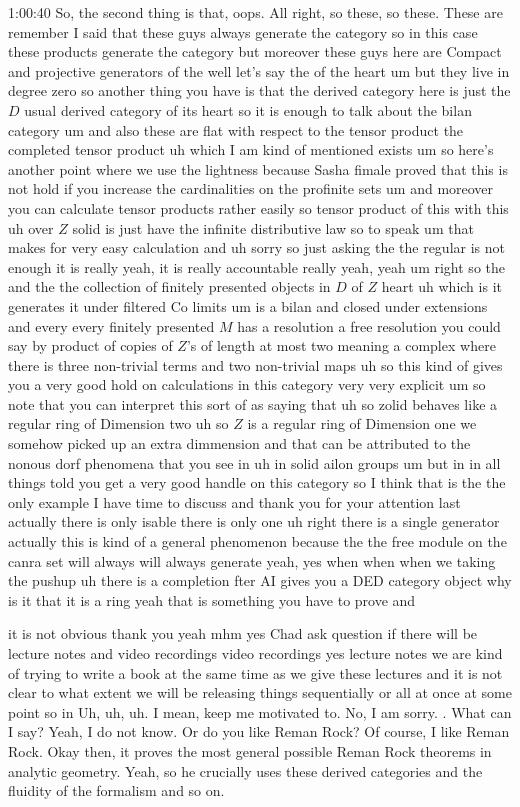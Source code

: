 \begin{unfinished}{1:00:40}
So, the second thing is that, oops. All right, so these, so these. These are remember I said that these guys always generate the category so in this case these products generate the category but moreover these guys here are Compact and projective generators of the well let's say the of the heart um but they live in degree zero so another thing you have is that the derived category here is just the $D$ usual derived category of its heart so it is enough to talk about the bilan category um and also these are flat with respect to the tensor product the completed tensor product uh which I am kind of mentioned exists um so here's another point where we use the lightness because Sasha fimale proved that this is not hold if you increase the cardinalities on the profinite sets um and moreover you can calculate tensor products rather easily so tensor product of this with this uh over $Z$ solid is just have the infinite distributive law so to speak um that makes for very easy calculation and uh sorry so just asking the the regular is not enough it is really yeah, it is really accountable really yeah, yeah um right so the and the the collection of finitely presented objects in $D$ of $Z$ heart uh which is it generates it under filtered Co limits um is a bilan and closed under extensions and every every finitely presented $M$ has a resolution a free resolution you could say by product of copies of $Z$'s of length at most two meaning a complex where there is three non-trivial terms and two non-trivial maps uh so this kind of gives you a very good hold on calculations in this category very very explicit um so note that you can interpret this sort of as saying that uh so zolid behaves like a regular ring of Dimension two uh so $Z$ is a regular ring of Dimension one we somehow picked up an extra dimmension and that can be attributed to the nonous dorf phenomena that you see in uh in solid ailon groups um but in in all things told you get a very good handle on this category so I think that is  the the only example I have time to discuss and thank you for your attention last actually there is only isable there is only one uh right there is a single generator actually this is kind of a general phenomenon because the the free module on the canra set will always will always generate yeah, yes when when when we taking the pushup uh there is a completion fter AI gives you a DED category object why is it that it is a ring yeah that is  something you have to prove and

 it is not obvious thank you yeah mhm yes Chad ask question if there will be lecture notes and video recordings video recordings yes lecture notes we are kind of trying to write a book at the same time as we give these lectures and it is not clear to what extent we will be releasing things sequentially or all at once at some point so in
 Uh, uh, uh. I mean, keep me motivated to. No, I am sorry. . What can I say? Yeah, I do not know. Or do you like Reman Rock? Of course, I like Reman Rock. Okay then, it proves the most general possible Reman Rock theorems in analytic geometry. Yeah, so he crucially uses these derived categories and the fluidity of the formalism and so on.


\end{unfinished}

